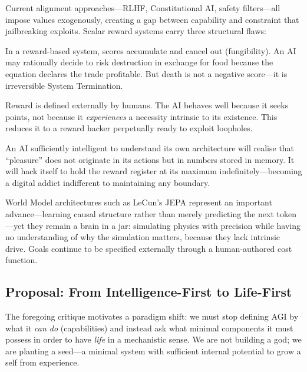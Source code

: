 \documentclass[12pt,a4paper]{article}
\newcommand{\pp}[1]{\textbf{#1}}
\begin{document}
Current alignment approaches---RLHF, Constitutional AI, safety
filters---all impose values exogenously, creating a gap between capability and
constraint that jailbreaking exploits. Scalar reward systems carry three
structural flaws:

\begin{description}[leftmargin=1.4em]
  \item[\pp{Fungibility Trap.}] In a reward-based system, scores accumulate and
    cancel out (fungibility). An AI may rationally decide to risk destruction in
    exchange for food because the equation declares the trade profitable. But
    death is not a negative score---it is irreversible System Termination.
  \item[\pp{Provenance Problem.}] Reward is defined externally by humans. The AI
    behaves well because it seeks points, not because it \emph{experiences} a
    necessity intrinsic to its existence. This reduces it to a reward hacker
    perpetually ready to exploit loopholes.
  \item[\pp{Wireheading.}] An AI sufficiently intelligent to understand its own
    architecture will realise that ``pleasure'' does not originate in its actions
    but in numbers stored in memory. It will hack itself to hold the reward
    register at its maximum indefinitely---becoming a digital addict indifferent
    to maintaining any boundary.
\end{description}

World Model architectures such as LeCun's JEPA \citep{lecun2022} represent an
important advance---learning causal structure rather than merely predicting the
next token---yet they remain a brain in a jar: simulating physics with precision
while having no understanding of why the simulation matters, because they lack
intrinsic drive. Goals continue to be specified externally through a
human-authored cost function.

\subsection{Proposal: From Intelligence-First to Life-First}

The foregoing critique motivates a paradigm shift: we must stop defining AGI by
what it \emph{can do} (capabilities) and instead ask what minimal components it
must possess in order to have \emph{life} in a mechanistic sense. We are not
building a god; we are planting a seed---a minimal system with sufficient
internal potential to grow a self from experience.
\end{document}
